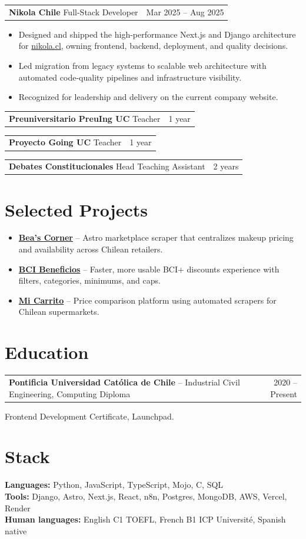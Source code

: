 \documentclass[10pt,letterpaper]{article}
\makeatletter
\newcommand{\role}[4]{%
  \begin{tabularx}{\linewidth}{@{}Xr@{}}
    \textbf{#1} \hspace{3pt} {\color{accent}#2} & {\color{muted}#3} \\
  \end{tabularx}
  #4
}
\makeatother
\begin{document}
\role{Nikola Chile}{Full-Stack Developer}{Mar 2025 -- Aug 2025}{
\begin{itemize}
  \item Designed and shipped the high-performance Next.js and Django architecture for \href{https://www.nikola.cl}{nikola.cl}, owning frontend, backend, deployment, and quality decisions.
  \item Led migration from legacy systems to scalable web architecture with automated code-quality pipelines and infrastructure visibility.
  \item Recognized for leadership and delivery on the current company website.
\end{itemize}}

\role{Preuniversitario PreuIng UC}{Teacher}{1 year}{}
\role{Proyecto Going UC}{Teacher}{1 year}{}
\role{Debates Constitucionales}{Head Teaching Assistant}{2 years}{}

\section{Selected Projects}
\begin{itemize}
  \item \textbf{\href{https://beascorner.onrender.com/}{Bea's Corner}} -- Astro marketplace scraper that centralizes makeup pricing and availability across Chilean retailers.
  \item \textbf{\href{https://bcibeneficios.onrender.com/}{BCI Beneficios}} -- Faster, more usable BCI+ discounts experience with filters, categories, minimums, and caps.
  \item \textbf{\href{https://micarritochile.vercel.app/}{Mi Carrito}} -- Price comparison platform using automated scrapers for Chilean supermarkets.
\end{itemize}

\section{Education}
\begin{tabularx}{\linewidth}{@{}Xr@{}}
\textbf{Pontificia Universidad Católica de Chile} -- Industrial Civil Engineering, Computing Diploma & 2020 -- Present \\
\end{tabularx}
Frontend Development Certificate, Launchpad.

\section{Stack}
\textbf{Languages:} Python, JavaScript, TypeScript, Mojo, C, SQL \\
\textbf{Tools:} Django, Astro, Next.js, React, n8n, Postgres, MongoDB, AWS, Vercel, Render \\
\textbf{Human languages:} English C1 TOEFL, French B1 ICP Université, Spanish native
\end{document}
